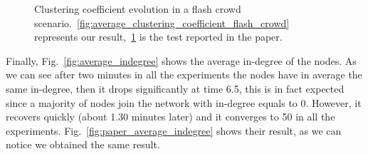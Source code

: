 \begin{figure}
\begin{subfigure}{.5\textwidth}
  \caption{}
  \label{fig:paper_average_clustering_coefficient_flash_crowd}
\end{subfigure}
\caption{Clustering coefficient evolution in a flash crowd scenario.~\ref{fig:average_clustering_coefficient_flash_crowd} represents our result,~\ref{fig:paper_average_clustering_coefficient_flash_crowd} is the test reported in the paper.}
\label{fig:robustness_cc_flash_crowd}
\end{figure}

Finally, Fig.~\ref{fig:average_indegree} shows the average in-degree of the nodes. As we can see after two minutes in all the experiments the nodes have in average the same in-degree, then it drops significantly at time 6.5, this is in fact expected since a majority of nodes join the network with in-degree equals to 0. However, it recovers quickly (about 1.30 minutes later) and it converges to 50 in all the experiments. Fig.~\ref{fig:paper_average_indegree} shows their result, as we can notice we obtained the same result.

